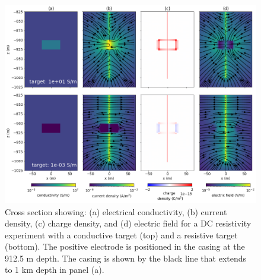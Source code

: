 \begin{figure}
    \begin{center}
    \includegraphics[width=\textwidth]{figures/target_physics.png}
    \end{center}
\caption{
    Cross section showing: (a) electrical conductivity, (b) current density, (c) charge density, and
    (d) electric field for a DC resistivity experiment with a conductive target (top) and a resistive target
    (bottom). The positive electrode is positioned in the casing at the 912.5 m depth.
    The casing is shown by the black line that extends to 1 km
    depth in panel (a).
}
\label{fig:target_physics}
\end{figure}
